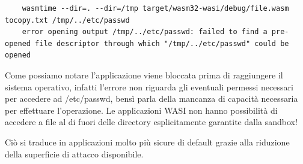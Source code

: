 \begin{lstlisting}
    wasmtime --dir=. --dir=/tmp target/wasm32-wasi/debug/file.wasm tocopy.txt /tmp/../etc/passwd
    error opening output /tmp/../etc/passwd: failed to find a pre-opened file descriptor through which "/tmp/../etc/passwd" could be opened
\end{lstlisting}

Come possiamo notare l'applicazione viene bloccata prima di raggiungere il sistema operativo, infatti l'errore non
riguarda gli eventuali permessi necessari per accedere ad /etc/passwd, bensì parla della mancanza di capacità necessaria
per effettuare l'operazione. Le applicazioni WASI non hanno possibilità di accedere a file al di fuori delle directory
esplicitamente garantite dalla sandbox!

Ciò si traduce in applicazioni molto più sicure di default grazie alla riduzione della superficie di attacco
disponibile.
